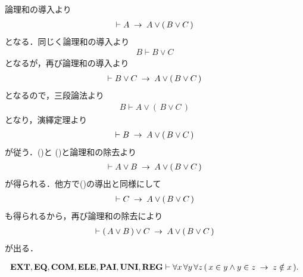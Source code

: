 	\begin{sketch}
		論理和の導入より
		\begin{align}
			\vdash A \hspace{0.25em}\rightarrow\hspace{0.25em} A \vee (\, B \vee C\, )
			\label{fom:associative_law_of_conjunctions_1}
		\end{align}
		となる．同じく論理和の導入より
		\begin{align}
			B \vdash B \vee C
		\end{align}
		となるが，再び論理和の導入より
		\begin{align}
			\vdash B \vee C \hspace{0.25em}\rightarrow\hspace{0.25em} A \vee (\, B \vee C\, )
		\end{align}
		となるので，三段論法より
		\begin{align}
			B \vdash A \vee (\, B \vee C\, )
		\end{align}
		となり，演繹定理より
		\begin{align}
			\vdash B \hspace{0.25em}\rightarrow\hspace{0.25em} A \vee (\, B \vee C\, )
			\label{fom:associative_law_of_conjunctions_2}
		\end{align}
		が従う．()と
		()と論理和の除去より
		\begin{align}
			\vdash A \vee B \hspace{0.25em}\rightarrow\hspace{0.25em} A \vee (\, B \vee C\, )
		\end{align}
		が得られる．他方で()の導出と同様にして
		\begin{align}
			\vdash C \hspace{0.25em}\rightarrow\hspace{0.25em} A \vee (\, B \vee C\, )
		\end{align}
		も得られるから，再び論理和の除去により
		\begin{align}
			\vdash (\, A \vee B\, ) \vee C \hspace{0.25em}\rightarrow\hspace{0.25em} A \vee (\, B \vee C\, )
		\end{align}
		が出る．
		\QED
	\end{sketch}
	
	\begin{screen}
		\begin{thm}[集合のどの三組も所属関係で堂々巡りしない]
		\label{thm:no_three_sets_go_round}
			\begin{align}
				\mbox{{\bf EXT}},\mbox{{\bf EQ}},\mbox{\bf COM},\mbox{{\bf ELE}},\mbox{{\bf PAI}},\mbox{{\bf UNI}},\mbox{{\bf REG}} \vdash 
				\forall x\, \forall y\, \forall z\, 
				(\, x \in y \wedge y \in z \hspace{0.25em}\rightarrow\hspace{0.25em} z \notin x\, ).
			\end{align}
		\end{thm}
	\end{screen}
	
